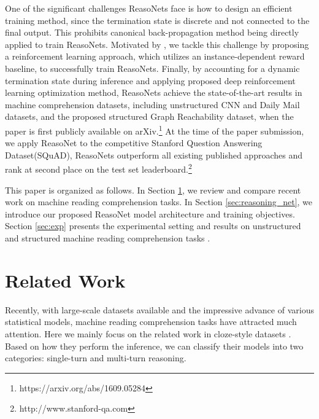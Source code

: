 \documentclass[sigconf]{acmart}
\begin{document}
One of the significant challenges ReasoNets face is how to design an efficient training method, since the termination state is discrete and not connected to the final output.  This prohibits canonical back-propagation method being directly applied to train ReasoNets.  Motivated by \cite{williams1992reinforce, mnih2014recurrent}, we tackle this challenge by proposing a reinforcement learning approach, which utilizes an instance-dependent reward baseline, to successfully train ReasoNets. %
Finally, by accounting for a dynamic termination state during inference and applying proposed deep reinforcement learning optimization method, ReasoNets achieve the state-of-the-art results in machine comprehension datasets, including unstructured CNN and Daily Mail datasets, and the proposed structured Graph Reachability dataset, when the paper is first publicly available on arXiv.\footnote{https://arxiv.org/abs/1609.05284} %
At the time of the paper submission, we apply ReasoNet to the competitive Stanford Question Answering Dataset(SQuAD), ReasoNets outperform all existing published approaches and rank at second place on the test set leaderboard.\footnote{http://www.stanford-qa.com} 

This paper is organized as follows. In Section \ref{sec:previous_work}, we review and compare recent work on machine reading comprehension tasks. In Section \ref{sec:reasoning_net}, we introduce our proposed ReasoNet model architecture and training objectives. Section \ref{sec:exp} presents the experimental setting and results on unstructured and structured machine reading comprehension tasks .%


\section{Related Work}
\label{sec:previous_work}
Recently, with large-scale datasets available and the impressive advance of various statistical models, machine reading comprehension tasks have attracted much attention. Here we mainly focus on the related work in cloze-style datasets \citep{HermannNIPS2015, HillICLR2016}. Based on how they perform the inference, we can classify their models into two categories: single-turn and multi-turn reasoning.
\end{document}
